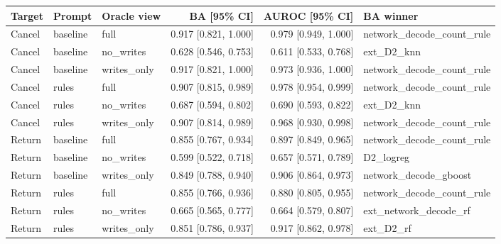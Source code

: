 \begin{tabular}{lllrrl}
\toprule
Target & Prompt & Oracle view & BA [95\% CI] & AUROC [95\% CI] & BA winner \\
\midrule
Cancel & baseline & full & 0.917 [0.821, 1.000] & 0.979 [0.949, 1.000] & network\_decode\_count\_rule \\
Cancel & baseline & no\_writes & 0.628 [0.546, 0.753] & 0.611 [0.533, 0.768] & ext\_D2\_knn \\
Cancel & baseline & writes\_only & 0.917 [0.821, 1.000] & 0.973 [0.936, 1.000] & network\_decode\_count\_rule \\
Cancel & rules & full & 0.907 [0.815, 0.989] & 0.978 [0.954, 0.999] & network\_decode\_count\_rule \\
Cancel & rules & no\_writes & 0.687 [0.594, 0.802] & 0.690 [0.593, 0.822] & ext\_D2\_knn \\
Cancel & rules & writes\_only & 0.907 [0.814, 0.989] & 0.968 [0.930, 0.998] & network\_decode\_count\_rule \\
Return & baseline & full & 0.855 [0.767, 0.934] & 0.897 [0.849, 0.965] & network\_decode\_count\_rule \\
Return & baseline & no\_writes & 0.599 [0.522, 0.718] & 0.657 [0.571, 0.789] & D2\_logreg \\
Return & baseline & writes\_only & 0.849 [0.788, 0.940] & 0.906 [0.864, 0.973] & network\_decode\_gboost \\
Return & rules & full & 0.855 [0.766, 0.936] & 0.880 [0.805, 0.955] & network\_decode\_count\_rule \\
Return & rules & no\_writes & 0.665 [0.565, 0.777] & 0.664 [0.579, 0.807] & ext\_network\_decode\_rf \\
Return & rules & writes\_only & 0.851 [0.786, 0.937] & 0.917 [0.862, 0.978] & ext\_D2\_rf \\
\bottomrule
\end{tabular}
